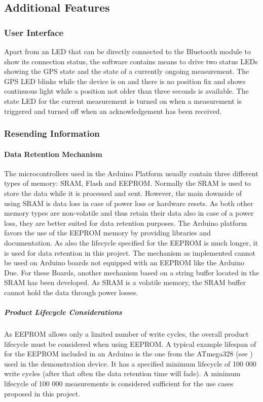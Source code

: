 \subsection{Additional Features}
\subsubsection{User Interface}
Apart from an LED that can be directly connected to the Bluetooth module to show its connection status, the software contains means to drive two status LEDs showing the GPS state and the state of a currently ongoing measurement. The GPS LED blinks while the device is on and there is no position fix and shows continuous light while a position not older than three seconds is available. The state LED for the current measurement is turned on when a measurement is triggered and turned off when an acknowledgement has been received.

\subsubsection{Resending Information}
\label{subsubs:resending}
\paragraph{Data Retention Mechanism}
The microcontrollers used in the Arduino Platform usually contain three different types of memory: SRAM, Flash and EEPROM. Normally the SRAM is used to store the data while it is processed and sent. However, the main downside of using SRAM is data loss in case of power loss or hardware resets. As both other memory types are non-volatile and thus retain their data also in case of a power loss, they are better suited for data retention purposes. The Arduino platform favors the use of the EEPROM memory by providing libraries and documentation. As also the lifecycle specified for the EEPROM is much longer, it is used for data retention in this project. The mechanism as implemented cannot be used on Arduino boards not equipped with an EEPROM like the Arduino Due. For these Boards, another mechanism based on a string buffer located in the SRAM has been developed. As SRAM is a volatile memory, the SRAM buffer cannot hold the data through power losses.

\subparagraph{Product Lifecycle Considerations}
As EEPROM allows only a limited number of write cycles, the overall product lifecycle must be considered when using EEPROM. A typical example lifespan of for the EEPROM included in an Arduino is the one from the ATmega328 (see \cite{ATmega328}) used in the demonstration device. It has a specified minimum lifecycle of 100 000 write cycles (after that often the data retention time will fade). A minimum lifecycle of 100 000 measurements is considered sufficient for the use cases proposed in this project.


